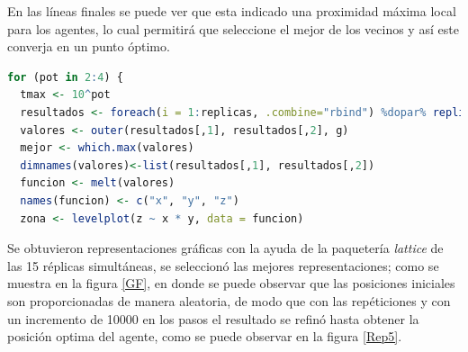 \documentclass[12pt, letterpaper] {article}
\begin{document}
En las l\'ineas finales se puede ver que esta indicado una proximidad m\'axima local para los agentes, lo cual permitir\'a que seleccione el mejor de los vecinos y as\'i este converja en un punto óptimo.

\begin{lstlisting}[language=R]
for (pot in 2:4) {
  tmax <- 10^pot
  resultados <- foreach(i = 1:replicas, .combine="rbind") %dopar% replica(tmax)
  valores <- outer(resultados[,1], resultados[,2], g)
  mejor <- which.max(valores)
  dimnames(valores)<-list(resultados[,1], resultados[,2])
  funcion <- melt(valores)
  names(funcion) <- c("x", "y", "z")
  zona <- levelplot(z ~ x * y, data = funcion)
\end{lstlisting}

Se obtuvieron representaciones gr\'aficas con la ayuda de la paqueter\'ia \textit{lattice} \cite{Lr} de las 15 réplicas simult\'aneas, se seleccionó las mejores representaciones; como se muestra en la figura \ref{GF}, en donde se puede observar que las posiciones iniciales son proporcionadas de manera aleatoria, de modo que con las repéticiones y con un incremento de 10000 en los pasos el resultado se refinó hasta obtener la posici\'on optima del agente, como se puede observar en la figura \ref{Rep5}.
\end{document}
